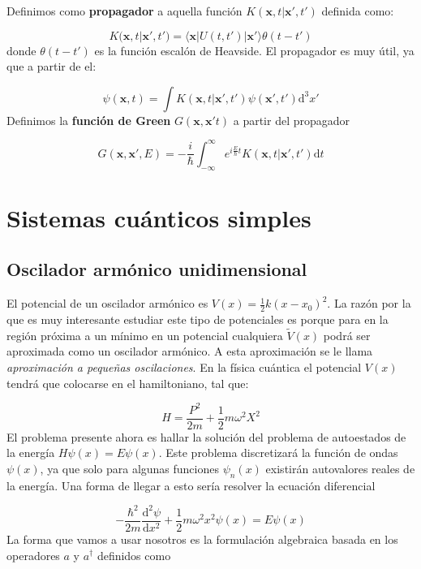 \documentclass[12pt]{book}
\numberwithin{equation}{chapter}
\numberwithin{figure}{chapter}
\newcommand{\D}{\mathrm{d}}
\newcommand{\derivadas}[2]{\frac{\D #1}{\D #2}}
\newcommand{\intinf}{\int_{-\infty}^{\infty}}
\newcommand{\xn}{\mathbf{x}}
\begin{document}
Definimos como \textbf{propagador} a aquella función $K(\xn,t|\xn',t')$  definida como:

\begin{equation}
K(\xn,t|\xn',t') = \langle \xn | U(t,t') | \xn'\rangle \theta(t-t')
\end{equation}
donde $\theta(t-t')$ es la función escalón de Heavside. El propagador es muy útil, ya que a partir de el:

\begin{equation}
\psi (\xn,t) = \int K(\xn,t|\xn',t') \psi (\xn',t') \D^3 x'
\end{equation}
Definimos la \textbf{ función de Green } $G(\xn,\xn't)$ a partir del propagador 

\begin{equation}
G(\xn,\xn',E) = - \frac{i}{\hbar} \intinf e^{i \frac{E}{\hbar} t} K(\xn,t|\xn',t') \D t
\end{equation}

\chapter{Sistemas cuánticos simples}


\section{Oscilador armónico unidimensional}

El potencial de un oscilador armónico es $V(x)=\frac{1}{2} k (x-x_0)^2$. La razón por la que es muy interesante estudiar este tipo de potenciales es porque para en la región próxima a un mínimo en un potencial cualquiera $\tilde{V}(x)$ podrá ser aproximada como un oscilador armónico. A esta aproximación se le llama \textit{aproximación a pequeñas oscilaciones}. En la física cuántica el potencial $V(x)$ tendrá que colocarse en el hamiltoniano, tal que:

\begin{equation}
H = \frac{P^2}{2m} + \frac{1}{2} m \omega^2 X^2
\end{equation}
El problema presente ahora es hallar la solución del problema de autoestados de la energía $H\psi(x)=E\psi(x)$. Este problema discretizará la función de ondas $\psi(x)$, ya que solo para algunas funciones $\psi_n(x)$ existirán autovalores reales de la energía. Una forma de llegar a esto sería resolver la ecuación diferencial 

\begin{equation}
-\frac{\hbar^2}{2m} \derivadas{^2 \psi}{x^2} + \frac{1}{2} m \omega^2 x^2 \psi(x) = E \psi(x)
\end{equation}
La forma que vamos a usar nosotros es la formulación algebraica basada en los operadores $a$ y $a^\dagger$ definidos como
\end{document}
